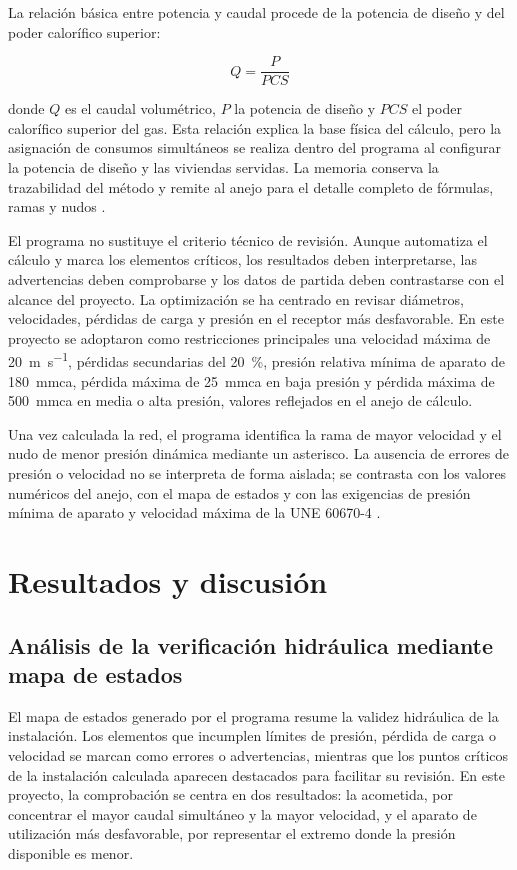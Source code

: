 \documentclass[12pt,a4paper]{article}
\begin{document}
La relación básica entre potencia y caudal procede de la potencia de diseño y del poder calorífico superior:

\begin{equation}
	Q = \frac{P}{PCS}
\end{equation}

donde $Q$ es el caudal volumétrico, $P$ la potencia de diseño y $PCS$ el poder calorífico superior del gas. Esta relación explica la base física del cálculo, pero la asignación de consumos simultáneos se realiza dentro del programa al configurar la potencia de diseño y las viviendas servidas. La memoria conserva la trazabilidad del método y remite al anejo para el detalle completo de fórmulas, ramas y nudos \cite{UNE60670_4_2023,DMElectManual}.

El programa no sustituye el criterio técnico de revisión. Aunque automatiza el cálculo y marca los elementos críticos, los resultados deben interpretarse, las advertencias deben comprobarse y los datos de partida deben contrastarse con el alcance del proyecto. La optimización se ha centrado en revisar diámetros, velocidades, pérdidas de carga y presión en el receptor más desfavorable. En este proyecto se adoptaron como restricciones principales una velocidad máxima de \SI{20}{\meter\per\second}, pérdidas secundarias del \SI{20}{\percent}, presión relativa mínima de aparato de \SI{180}{mmca}, pérdida máxima de \SI{25}{mmca} en baja presión y pérdida máxima de \SI{500}{mmca} en media o alta presión, valores reflejados en el anejo de cálculo.

Una vez calculada la red, el programa identifica la rama de mayor velocidad y el nudo de menor presión dinámica mediante un asterisco. La ausencia de errores de presión o velocidad no se interpreta de forma aislada; se contrasta con los valores numéricos del anejo, con el mapa de estados y con las exigencias de presión mínima de aparato y velocidad máxima de la UNE 60670-4 \cite{UNE60670_4_2023,DMElectManual}.

\section{Resultados y discusión}

\subsection{Análisis de la verificación hidráulica mediante mapa de estados}

El mapa de estados generado por el programa resume la validez hidráulica de la instalación. Los elementos que incumplen límites de presión, pérdida de carga o velocidad se marcan como errores o advertencias, mientras que los puntos críticos de la instalación calculada aparecen destacados para facilitar su revisión. En este proyecto, la comprobación se centra en dos resultados: la acometida, por concentrar el mayor caudal simultáneo y la mayor velocidad, y el aparato de utilización más desfavorable, por representar el extremo donde la presión disponible es menor.
\end{document}
